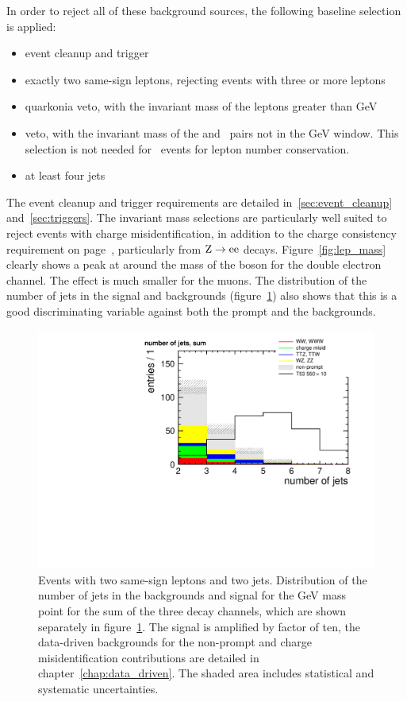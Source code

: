 In order to reject all of these background sources, the following baseline
selection is applied:
\begin{itemize}
    \item event cleanup and trigger
    \item exactly two same-sign leptons, rejecting events with three or more
        leptons
    \item quarkonia veto, with the invariant mass of the leptons greater
        than \unit[20]{GeV}
    \item \Z veto, with the invariant mass of the \E\E and \M\M\ pairs not in
        the \unit[76-106]{GeV} window. This selection is not needed for
        \E\M\
        events for lepton number conservation.
    \item at least four jets
\end{itemize}
The event cleanup and trigger requirements are detailed
in~\ref{sec:event_cleanup} and~\ref{sec:triggers}.
The invariant mass selections are particularly well suited to 
reject events with charge misidentification, in addition to the charge
consistency requirement on page~\pageref{page:electron_charge}, particularly from $\mathrm{Z}
\rightarrow \mathrm{e}\mathrm{e}$ decays. Figure~\ref{fig:lep_mass} clearly shows a peak at
around the mass of the \Z boson for the double electron channel. The effect
is much smaller for the muons. 
The distribution of the number of jets in the signal and backgrounds
(figure~\ref{fig:n_jets}) also
shows that this is a good discriminating variable against both the
prompt and the \ttbar backgrounds.

\begin{figure}[htb]
    \centering
    \includegraphics[width=\textwidth]{images/pdf/same-sign,_2_jets/n_jets_sum_0}
    \caption{Events with two same-sign leptons and two jets. Distribution of the number of jets in the backgrounds and
        signal for the \unit[550]{GeV} mass point for the sum of the three
        decay channels, which are shown separately in
        figure~\ref{fig:n_jets}. The signal is
    amplified by factor of ten, the data-driven backgrounds for the
non-prompt and charge misidentification contributions are detailed in
chapter~\ref{chap:data_driven}. The shaded area includes statistical and
systematic uncertainties.}
    \label{fig:n_jets}
\end{figure}

